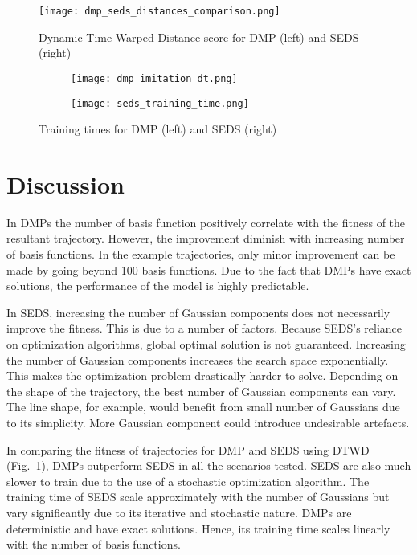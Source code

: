 \documentclass[conference]{IEEEtran}
\begin{document}
\begin{figure}
    \centering
    \texttt{[image: dmp\_seds\_distances\_comparison.png]}
    \caption{Dynamic Time Warped Distance score for DMP (left) and SEDS (right)}
    \label{fig:dtw}
\end{figure}

\begin{figure}
    \centering
    \begin{subfigure}[b]{0.49\columnwidth}
        \centering
        \texttt{[image: dmp\_imitation\_dt.png]}
    \end{subfigure}
    \begin{subfigure}[b]{0.49\columnwidth}
        \centering
        \texttt{[image: seds\_training\_time.png]}
    \end{subfigure}
    \caption{Training times for DMP (left) and SEDS (right)}
    \label{fig:dtw_dt}
\end{figure}

\section{Discussion}

In DMPs the number of basis function positively correlate with the fitness of the resultant trajectory. However, the improvement diminish with increasing number of basis functions. In the example trajectories, only minor improvement can be made by going beyond 100 basis functions. Due to the fact that DMPs have exact solutions, the performance of the model is highly predictable.

In SEDS, increasing the number of Gaussian components does not necessarily improve the fitness. This is due to a number of factors. Because SEDS's reliance on optimization algorithms, global optimal solution is not guaranteed. Increasing the number of Gaussian components increases the search space exponentially. This makes the optimization problem drastically harder to solve. Depending on the shape of the trajectory, the best number of Gaussian components can vary. The line shape, for example, would benefit from small number of Gaussians due to its simplicity. More Gaussian component could introduce undesirable artefacts.

In comparing the fitness of trajectories for DMP and SEDS using DTWD (Fig.~\ref{fig:dtw}), DMPs outperform SEDS in all the scenarios tested. SEDS are also much slower to train due to the use of a stochastic optimization algorithm. The training time of SEDS scale approximately with the number of Gaussians but vary significantly due to its iterative and stochastic nature. DMPs are deterministic and have exact solutions. Hence, its training time scales linearly with the number of basis functions.
\end{document}
